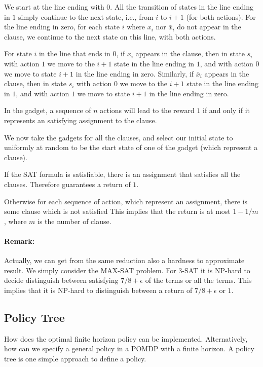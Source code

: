We start at the line ending with $0$. All the transition of states in the line ending in $1$ simply continue to the next state, i.e., from $i$ to $i+1$ (for both actions). For the line ending in zero, for each state $i$ where $x_i$ nor $\bar{x}_i$ do not appear in the clause, we continue to the next state on this line, with both actions.

For state $i$ in the line that ends in $0$, if $x_i$ appears in the clause, then in state $s_i$ with action $1$ we move to the $i+1$ state in the line ending in $1$, and with action $0$ we move to state $i+1$ in the line ending in zero. Similarly, if $\bar{x}_i$ appears in the clause,  then in state $s_i$ with action $0$ we move to the $i+1$ state in the line ending in $1$, and with action $1$ we move to state $i+1$ in the line ending in zero.

In the gadget, a sequence of $n$ actions will lead to the reward $1$ if and only if it represents an satisfying assignment to the clause.

We now take the gadgets for all the clauses, and select our initial state to uniformly at random to be the start state of one of the gadget (which represent a clause).

If the SAT formula is satisfiable, there is an assignment that satisfies all the clauses. Therefore guarantees a return of $1$.

Otherwise for each sequence of action, which represent an assignment, there is some clause which is not satisfied This implies that the return is at most $1-1/m$, where $m$ is the number of clause.

\paragraph{Remark:} Actually, we can get from the same reduction also a hardness to approximate result. We simply consider the MAX-SAT problem. For 3-SAT it is NP-hard to decide distinguish between satisfying $7/8+\epsilon$ of the terms or all the terms. This implies that it is NP-hard to distinguish between a return of $7/8+\epsilon$ or $1$.

\subsection{Policy Tree}

How does the optimal finite horizon policy can be implemented. Alternatively, how can we specify a general policy in a POMDP with a finite horizon. A policy tree is one simple approach to define a policy.

